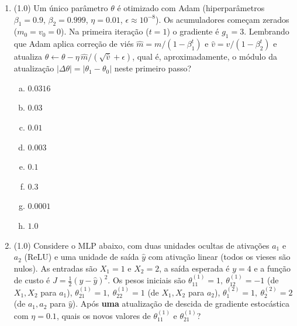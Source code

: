 \documentclass[11pt,a4paper]{article}
\begin{document}
\begin{enumerate}[1)]


\item (1.0) Um único parâmetro $\theta$ é otimizado com Adam (hiperparâmetros $\beta_1 = 0.9$, $\beta_2 = 0.999$, $\eta = 0.01$, $\epsilon \approx 10^{-8}$). Os acumuladores começam zerados ($m_0 = v_0 = 0$). Na primeira iteração ($t = 1$) o gradiente é $g_1 = 3$. Lembrando que Adam aplica correção de viés $\hat{m} = m / (1 - \beta_1^{t})$ e $\hat{v} = v / (1 - \beta_2^{t})$ e atualiza $\theta \leftarrow \theta - \eta\,\hat{m}/(\sqrt{\hat{v}} + \epsilon)$, qual é, aproximadamente, o módulo da atualização $|\Delta\theta| = |\theta_1 - \theta_0|$ neste primeiro passo?

\begin{enumerate}[a)]
    \item $0.0316$
    \item $0.03$
    \item $0.01$
    \item $0.003$
    \item $0.1$
    \item $0.3$
    \item $0.0001$
    \item $1.0$
\end{enumerate}

\pagebreak

\item (1.0) Considere o MLP abaixo, com duas unidades ocultas de ativações $a_1$ e $a_2$ (ReLU) e uma unidade de saída $\hat{y}$ com ativação linear (todos os vieses são nulos). As entradas são $X_1 = 1$ e $X_2 = 2$, a saída esperada é $y = 4$ e a função de custo é $J = \tfrac{1}{2}(y - \hat{y})^2$. Os pesos iniciais são
$\theta^{(1)}_{11} = 1,\ \theta^{(1)}_{12} = -1$ (de $X_1, X_2$ para $a_1$),
$\theta^{(1)}_{21} = 1,\ \theta^{(1)}_{22} = 1$ (de $X_1, X_2$ para $a_2$),
$\theta^{(2)}_{1} = 1,\ \theta^{(2)}_{2} = 2$ (de $a_1, a_2$ para $\hat{y}$).
Após \textbf{uma} atualização de descida de gradiente estocástica com $\eta = 0.1$, quais os novos valores de $\theta^{(1)}_{11}$ e $\theta^{(1)}_{21}$?


\end{enumerate}
\end{document}
